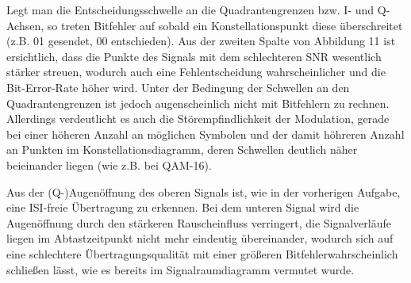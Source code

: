 \documentclass[a4paper, 12pt]{article}
\begin{document}
  Legt man die Entscheidungsschwelle an die Quadrantengrenzen bzw. I- und
  Q-Achsen, so treten Bitfehler auf sobald ein Konstellationspunkt diese
  überschreitet (z.B. 01 gesendet, 00 entschieden). Aus der zweiten Spalte von
  Abbildung 11 ist ersichtlich, dass die Punkte des Signals mit dem schlechteren
  SNR wesentlich stärker streuen, wodurch auch eine Fehlentscheidung
  wahrscheinlicher und die Bit-Error-Rate höher wird. Unter der Bedingung der
  Schwellen an den Quadrantengrenzen ist jedoch augenscheinlich nicht mit
  Bitfehlern zu rechnen. Allerdings verdeutlicht es auch die Störempfindlichkeit der
  Modulation, gerade bei einer höheren Anzahl an möglichen Symbolen und der damit
  höhreren Anzahl an Punkten im Konstellationsdiagramm, deren Schwellen deutlich näher beieinander liegen (wie z.B. bei QAM-16).

  Aus der (Q-)Augenöffnung des oberen Signals ist, wie in der vorherigen Aufgabe,
  eine ISI-freie Übertragung zu erkennen. Bei dem unteren Signal wird die
  Augenöffnung durch den stärkeren Rauscheinfluss verringert, die Signalverläufe
  liegen im Abtastzeitpunkt nicht mehr eindeutig übereinander, wodurch sich auf
  eine schlechtere Übertragungsqualität mit einer größeren
  Bitfehlerwahrscheinlich schließen lässt, wie es bereits im Signalraumdiagramm
  vermutet wurde.
\end{document}
